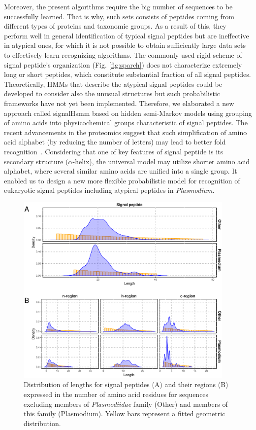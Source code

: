 \documentclass[10pt,letterpaper]{article}
\begin{document}
Moreover, the present algorithms require the big number of sequences to be successfully learned. That is why, such sets consists of peptides coming from different types of proteins and taxonomic groups. As a result of this, they perform well in general identification of typical signal peptides but are ineffective in atypical ones, for which it is not possible to obtain sufficiently large data sets to effectively learn recognizing algorithms. The commonly used rigid scheme of signal peptide's organization (Fig. \ref{fig:sparch}) does not characterize extremely long or short peptides, which constitute substantial fraction of all signal peptides. Theoretically, HMMs that describe the atypical signal peptides could be developed to consider also the unusual structures but such probabilistic frameworks have not yet been implemented. Therefore, we elaborated a new approach called signalHsmm based on hidden semi-Markov models using grouping of amino acids into physicochemical groups characteristic of signal peptides. The recent advancements in the proteomics suggest that such simplification of amino acid alphabet (by reducing the number of letters) may lead to better fold recognition~\cite{2000murphysimplified, 2009petersonreduced}. Considering that one of key features of signal peptide is its secondary structure ($\alpha$-helix), the universal model may utilize shorter amino acid alphabet, where several similar amino acids are unified into a single group. It enabled us to design a new more flexible probabilistic model for recognition of eukaryotic signal peptides including atypical peptides in \textsl{Plasmodium}.



\begin{figure}[ht]\centering
\includegraphics[width=0.95\textwidth]{figures/reglen.eps}
\caption{Distribution of lengths for signal peptides (A) and their regions (B) expressed in the number of amino acid residues for sequences excluding members of \textit{Plasmodiidae} family (Other) and members of this family (Plasmodium). Yellow bars represent a fitted geometric distribution.}
\label{fig:reglen}
\end{figure}
\end{document}
